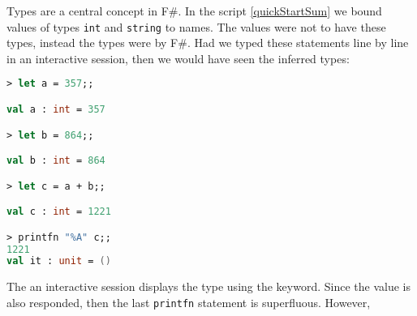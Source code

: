 Types are a central concept in F\#. In the script \ref{quickStartSum} we bound values of types \lstinline|int| and \lstinline|string| to names. The values were not  to have these types, instead the types were  by F\#. Had we typed these statements line by line in an interactive session, then we would have seen the inferred types:
\begin{comment}
$ fsharpi

F# Interactive for F# 4.0 (Open Source Edition)
Freely distributed under the Apache 2.0 Open Source License

For help type #help;;

\end{comment}
\begin{comment}
  $
\end{comment}
\begin{lstlisting}[language=fsharp,caption={fsharpi}]
> let a = 357;;         

val a : int = 357

> let b = 864;;

val b : int = 864

> let c = a + b;;

val c : int = 1221

> printfn "%A" c;;
1221
val it : unit = ()
\end{lstlisting}
\begin{comment}

> #quit;;
\end{comment}
 The an interactive session displays the type using the  keyword. Since the value is also responded, then the last \lstinline|printfn| statement is superfluous. However, 

